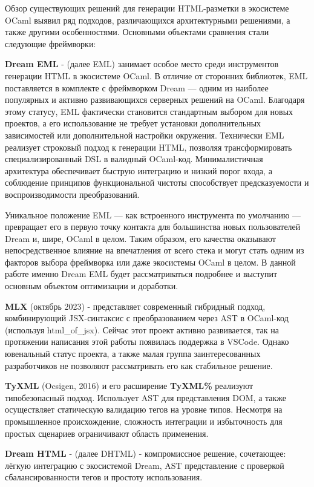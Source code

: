 Обзор существующих решений для генерации HTML-разметки в экосистеме OCaml выявил ряд подходов, различающихся архитектурными решениями, а также другими особенностями.
Основными объектами сравнения стали следующие фреймворки:

\textbf{Dream EML} - (далее EML) занимает особое место среди инструментов генерации HTML в экосистеме OCaml.
В отличие от сторонних библиотек, EML поставляется в комплекте с фреймворком Dream — одним из наиболее популярных и активно развивающихся серверных решений на OCaml.
Благодаря этому статусу, EML фактически становится стандартным выбором для новых проектов, а его использование не требует установки дополнительных зависимостей или дополнительной настройки окружения.
Технически EML реализует строковый подход к генерации HTML, позволяя трансформировать специализированный DSL в валидный OCaml-код.
Минималистичная архитектура обеспечивает быструю интеграцию и низкий порог входа, а соблюдение принципов функциональной чистоты способствует предсказуемости и воспроизводимости преобразований.

Уникальное положение EML — как встроенного инструмента по умолчанию — превращает его в первую точку контакта для большинства новых пользователей Dream и, шире, OCaml в целом.
Таким образом, его качества оказывают непосредственное влияние на впечатления от всего стека и могут стать одним из факторов выбора фреймворка или даже экосистемы OCaml в целом.
В данной работе именно Dream EML будет рассматриваться подробнее и выступит основным объектом оптимизации и доработки.

\textbf{MLX} (октябрь 2023) - представляет современный гибридный подход, комбинирующий JSX-синтаксис с преобразованием через AST в OCaml-код (используя html\_of\_jsx).
Сейчас этот проект активно развивается, так на протяжении написания этой работы появилась поддержка в VSCode.
Однако ювенальный статус проекта, а также малая группа заинтересованных разработчиков не позволяют рассматривать его как стабильное решение.

\textbf{TyXML} (Ocsigen, 2016) и его расширение \textbf{TyXML\%} реализуют типобезопасный подход.
Использует AST для представления DOM, а также осуществляет статическую валидацию тегов на уровне типов.
Несмотря на промышленное происхождение, сложность интеграции и избыточность для простых сценариев ограничивают область применения.

\textbf{Dream HTML} - (далее DHTML) - компромиссное решение, сочетающее: лёгкую интеграцию с экосистемой Dream, AST представление с проверкой сбалансированности тегов и простоту использования.

